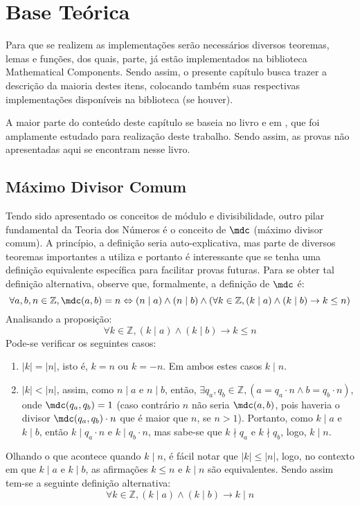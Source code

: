 \chapter{Base Teórica}
\label{cap:base}

Para que se realizem as implementações serão necessários diversos teoremas, lemas e funções, dos quais, parte, já estão implementados na biblioteca Mathematical Components. Sendo assim, o presente capítulo busca trazer a descrição da maioria destes itens, colocando também suas respectivas implementações disponíveis na biblioteca (se houver). 

A maior parte do conteúdo deste capítulo se baseia no livro \cite{book:2399854} e em \cite{euler-crit-planet}, que foi amplamente estudado para realização deste trabalho. Sendo assim, as provas não apresentadas aqui se encontram nesse livro.

\section{Máximo Divisor Comum}
Tendo sido apresentado os conceitos de módulo e divisibilidade, outro pilar fundamental da Teoria dos Números é o conceito de $\mdc$ (máximo divisor comum). A princípio, a definição seria auto-explicativa, mas parte de diversos teoremas importantes a utiliza e portanto é interessante que se tenha uma definição equivalente específica para facilitar provas futuras. Para se obter tal definição alternativa, observe que, formalmente, a definição de $\mdc$ é:
    \begin{equation*}
        \forall a, b, n \in \mathbb{Z},  \mdc(a, b) = n \Leftrightarrow (n \mid a) \land (n \mid b) \land (\forall k \in \mathbb{Z}, (k \mid a) \land (k \mid b) \rightarrow k \leq n)
    \end{equation*}
Analisando a proposição:
    \begin{equation*}
        \forall k \in \mathbb{Z}, (k \mid a) \land (k \mid b) \rightarrow k \leq n
    \end{equation*}
Pode-se verificar os seguintes casos:
    \begin{enumerate}
        \item $|k| = |n|$, isto é, $k = n$ ou $k = -n$. Em ambos estes casos $k \mid n$.

        \item $|k| < |n|$, assim, como $n \mid a$ e $n \mid b$, então, $\exists q_a, q_b \in \mathbb{Z}, (a = q_a \cdot n \land b = q_b \cdot n) $, onde $\mdc(q_a, q_b) = 1$ (caso contrário $n$ não seria $\mdc(a,b)$, pois haveria o divisor $\mdc(q_a, q_b) \cdot n$ que é maior que $n$, se $n > 1$). Portanto, como $k \mid a$ e $k \mid b$, então $k \mid q_a \cdot n$ e $k \mid q_b \cdot n$, mas sabe-se que $k \nmid q_a$ e $k \nmid q_b$, logo, $k \mid n$.
    \end{enumerate}
Olhando o que acontece quando $k \mid n$, é fácil notar que $|k| \leq |n|$, logo, no contexto em que $k \mid a$ e $k \mid b$, as afirmações $k \leq n$ e $k \mid n$ são equivalentes. Sendo assim tem-se a seguinte definição alternativa:
\begin{equation*}
        \forall k \in \mathbb{Z}, (k \mid a) \land (k \mid b) \rightarrow k \mid n
\end{equation*}    

